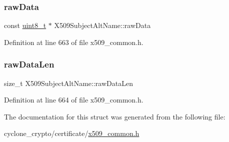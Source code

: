 \subsubsection{\texorpdfstring{raw\+Data}{rawData}}
{\footnotesize\ttfamily const \hyperlink{stdint_8h_aba7bc1797add20fe3efdf37ced1182c5}{uint8\+\_\+t} $\ast$ X509\+Subject\+Alt\+Name\+::raw\+Data}



Definition at line 663 of file x509\+\_\+common.\+h.

\mbox{\label{structX509SubjectAltName_a87435ad32eda0d4b0a9229028521812b}} 
\subsubsection{\texorpdfstring{raw\+Data\+Len}{rawDataLen}}
{\footnotesize\ttfamily size\+\_\+t X509\+Subject\+Alt\+Name\+::raw\+Data\+Len}



Definition at line 664 of file x509\+\_\+common.\+h.



The documentation for this struct was generated from the following file\+:\begin{DoxyCompactItemize}
\item 
cyclone\+\_\+crypto/certificate/\hyperlink{certificate_2x509__common_8h}{x509\+\_\+common.\+h}\end{DoxyCompactItemize}
